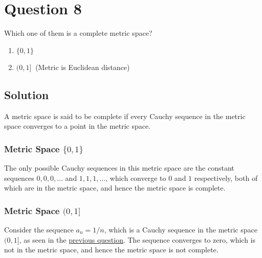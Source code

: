 \section*{Question 8}

Which one of them is a complete metric space?
\begin{enumerate}[noitemsep, nolistsep, label= (\alph*)]
    \item \( \{ 0,1 \} \)
    \item \( ( 0,1 ] \ \) (Metric is Euclidean distance)
\end{enumerate}

\subsection*{Solution}

A metric space is said to be complete if every Cauchy sequence in the metric space converges to a point in the metric space.

\subsubsection*{Metric Space \( \{ 0,1 \} \)}

The only possible Cauchy sequences in this metric space are the constant sequences \( 0, 0, 0, \dots \) and \( 1, 1, 1, \dots \), which converge to \( 0 \) and \( 1 \) respectively, both of which are in the metric space, and hence the metric space is complete.

\subsubsection*{Metric Space \( ( 0,1 ] \)}

Consider the sequence \( a_n = 1/n \), which is a Cauchy sequence in the metric space \( ( 0,1 ] \), as seen in the \hyperref[sec:q7]{previous question}.
The sequence converges to zero, which is not in the metric space, and hence the metric space is not complete.
